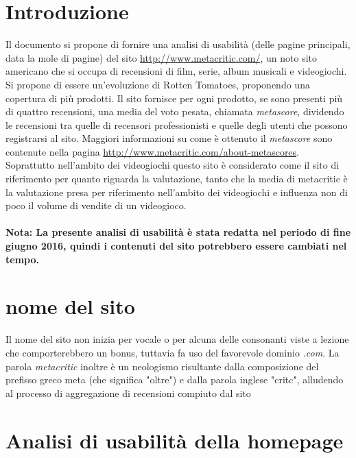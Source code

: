 \documentclass[12pt]{article}
\begin{document}
\newpage
\renewcommand{\contentsname}{Indice}
\tableofcontents

\newpage
{}

\section{Introduzione}
Il documento si propone di fornire una analisi di usabilità (delle pagine principali, data la mole di pagine) del sito \url{http://www.metacritic.com/}, un noto sito americano che si occupa di recensioni di film, serie, album musicali e videogiochi. Si propone di essere un'evoluzione di Rotten Tomatoes, proponendo una copertura di più prodotti. Il sito fornisce per ogni prodotto, se sono presenti più di quattro recensioni, una media del voto pesata, chiamata \textit{metascore}, dividendo le recensioni tra quelle di recensori professionisti e quelle degli utenti che possono registrarsi al sito. Maggiori informazioni su come è ottenuto il \textit{metascore} sono contenute nella pagina \url{http://www.metacritic.com/about-metascores}.\\
Soprattutto nell'ambito dei videogiochi questo sito è considerato come il sito di riferimento per quanto riguarda la valutazione, tanto che la media di metacritic è la valutazione presa per riferimento nell'ambito dei videogiochi e influenza non di poco il volume di vendite di un videogioco.
\\ \\ \textbf{Nota: La presente analisi di usabilità è stata redatta nel periodo di fine giugno 2016, quindi i contenuti del sito potrebbero essere cambiati nel tempo.}
\section{nome del sito}
Il nome del sito non inizia per vocale o per alcuna delle consonanti viste a lezione che comporterebbero un bonus, tuttavia fa uso del favorevole dominio \textit{.com}. La parola \textit{metacritic} inoltre è un neologismo risultante dalla composizione del prefisso greco meta (che significa "oltre") e dalla parola inglese "critc", alludendo al processo di aggregazione di recensioni compiuto dal sito
\newpage
\section{Analisi di usabilità della homepage}
\end{document}
